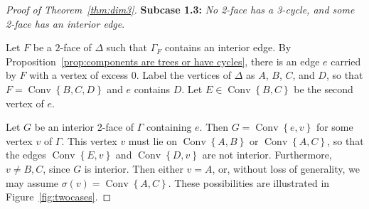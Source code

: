 \documentclass[10pt]{amsart}
\DeclareMathOperator{\Convop}{Conv}
\newcommand{\Conv}[1]{\Convop\left\{{#1}\right\}}
\newenvironment{proofsection}[2]{\par\smallskip\noindent\textbf{#1} \emph{#2}.\par\nobreak}{\par\smallskip}
\begin{document}
\begin{proof}[Proof of Theorem~\ref{thm:dim3}]
\begin{proofsection}{Subcase 1.3:}{No 2-face has a 3-cycle, and some 2-face has an interior edge}

Let $F$ be a $2$-face of $\Delta$ such that $\Gamma_F$ contains an interior edge. By Proposition~\ref{prop:components are trees or have cycles}, there is an edge $e$ carried by $F$ with a vertex of excess 0. Label the vertices of $\Delta$ as $A$, $B$, $C$, and $D$, so that $F = \Conv{B,C,D}$ and $e$ contains $D$. Let $E \in \Conv{B,C}$ be the second vertex of $e$.

Let $G$ be an interior 2-face of $\Gamma$ containing $e$. Then $G=\Conv{e,v}$ for some vertex $v$ of $\Gamma$. This vertex $v$ must lie on $\Conv{A,B}$ or $\Conv{A,C}$, so that the edges $\Conv{E,v}$ and $\Conv{D,v}$ are not interior. Furthermore, $v\ne B,C$, since $G$ is interior. Then either $v=A$, or, without loss of generality, we may assume $\sigma(v)=\Conv{A,C}$. These possibilities are illustrated in Figure~\ref{fig:twocases}.


\end{proofsection}
\end{proof}
\end{document}
